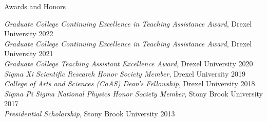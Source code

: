 \documentclass{resume} %
\begin{document}

\begin{rSection}{Awards and Honors}

\textit{Graduate College Continuing Excellence in Teaching Assistance Award}, Drexel University \hfill{2022} \\
\textit{Graduate College Continuing Excellence in Teaching Assistance Award}, Drexel University \hfill{2021} \\
\textit{Graduate College Teaching Assistant Excellence Award}, Drexel University \hfill{2020} \\
\textit{Sigma Xi Scientific Research Honor Society Member}, Drexel University \hfill{2019}\\
\textit{College of Arts and Sciences (CoAS) Dean's Fellowship}, Drexel University \hfill {2018}\\
\textit{Sigma Pi Sigma National Physics Honor Society Member}, Stony Brook University \hfill{2017}\\
\textit{Presidential Scholarship}, Stony Brook University \hfill {2013}

\end{rSection}

\end{document}

